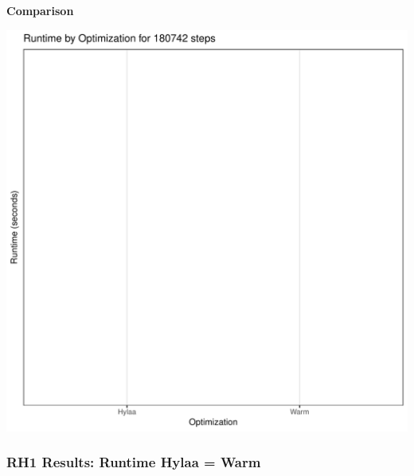 \documentclass{article}\usepackage[]{graphicx}\usepackage[]{color}
\makeatletter
\def\maxwidth{ %
  \ifdim\Gin@nat@width>\linewidth
    \linewidth
  \else
    \Gin@nat@width
  \fi
}
\newenvironment{knitrout}{}{} %
\makeatother
\begin{document}
 \textbf{Comparison}
  
\begin{knitrout}
\color{fgcolor}
\includegraphics[width=\maxwidth]{figure/RH1_steps180742-1} 

\end{knitrout}


 

	
	\subsubsection{RH1 Results: Runtime Hylaa = Warm}
	
\end{document}
